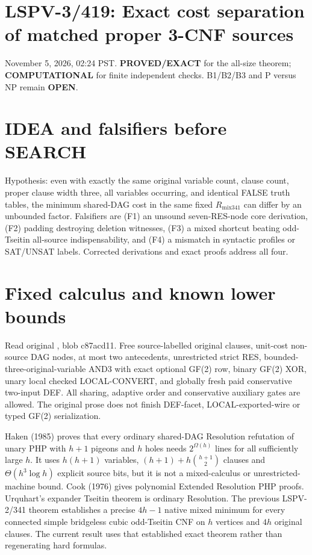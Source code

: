 \documentclass{article}
\begin{document}
\section*{LSPV-3/419: Exact cost separation of matched proper 3-CNF sources}
November 5, 2026, 02:24 PST. \textbf{PROVED/EXACT} for the all-size theorem; \textbf{COMPUTATIONAL} for finite independent checks. B1/B2/B3 and P versus NP remain \textbf{OPEN}.

\section*{IDEA and falsifiers before SEARCH}
Hypothesis: even with exactly the same original variable count, clause count, proper clause width three, all variables occurring, and identical FALSE truth tables, the minimum shared-DAG cost in the same fixed $R_{\mathrm{mix341}}$ can differ by an unbounded factor. Falsifiers are (F1) an unsound seven-RES-node core derivation, (F2) padding destroying deletion witnesses, (F3) a mixed shortcut beating odd-Tseitin all-source indispensability, and (F4) a mismatch in syntactic profiles or SAT/UNSAT labels. Corrected derivations and exact proofs address all four.

\section*{Fixed calculus and known lower bounds}
Read original , blob c87acd11. Free source-labelled original clauses, unit-cost non-source DAG nodes, at most two antecedents, unrestricted strict RES, bounded-three-original-variable AND3 with exact optional GF(2) row, binary GF(2) XOR, unary local checked LOCAL-CONVERT, and globally fresh paid conservative two-input DEF. All sharing, adaptive order and conservative auxiliary gates are allowed. The original prose does not finish DEF-facet, LOCAL-exported-wire or typed GF(2) serialization.

Haken (1985) proves that every ordinary shared-DAG Resolution refutation of unary PHP with $h+1$ pigeons and $h$ holes needs $2^{\Omega(h)}$ lines for all sufficiently large $h$. It uses $h(h+1)$ variables, $(h+1)+h\binom{h+1}{2}$ clauses and $\Theta(h^3\log h)$ explicit source bits, but it is not a mixed-calculus or unrestricted-machine bound. Cook (1976) gives polynomial Extended Resolution PHP proofs. Urquhart's expander Tseitin theorem is ordinary Resolution. The previous LSPV-2/341 theorem establishes a precise $4h-1$ native mixed minimum for every connected simple bridgeless cubic odd-Tseitin CNF on $h$ vertices and $4h$ original clauses. The current result uses that established exact theorem rather than regenerating hard formulas.
\end{document}
